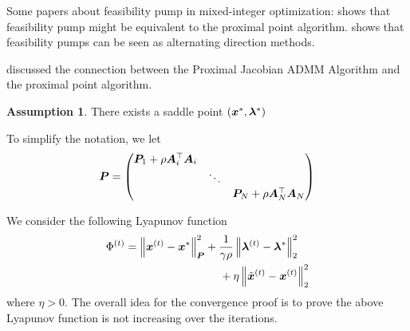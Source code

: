 \documentclass[twocolumn,amsthm]{autart}%
\theoremstyle{definition}
\newtheorem{assumption}{Assumption}
\theoremstyle{plain}
\begin{document}
Some papers about feasibility pump in mixed-integer optimization: \cite{boland2012new} shows that feasibility pump might be equivalent to the proximal point algorithm.
\cite{geissler2017penalty} shows that feasibility pumps can be seen as alternating direction methods.

\cite[Section V]{deng2017parallel} discussed the connection between the Proximal Jacobian ADMM Algorithm and the proximal point algorithm.


\begin{assumption}
There exists a saddle point $(\boldsymbol{x}^{*}, \boldsymbol{\lambda}^{*})$
\end{assumption}

To simplify the notation, we let
\begin{equation}
\boldsymbol{P} = 
\begin{pmatrix}
\boldsymbol{P}_{1} + \rho \boldsymbol{A}_i^\top \boldsymbol{A}_i \\
& \ddots \\
& & \boldsymbol{P}_N + \rho \boldsymbol{A}_N^\top \boldsymbol{A}_N
\end{pmatrix}
\end{equation}

We consider the following Lyapunov function
\begin{equation}
\begin{multlined}
\Phi^{(t)} = \norm{\bbsym{x}^{(t)}-\bbsym{x}^{*}}^2_{\bbsym{P}}
+ \frac{1}{\gamma \rho} \norm{\bbsym{\lambda}^{(t)}-\bbsym{\lambda}^{*}}_2^2 \\
+ \eta \norm{\xtil^{(t)} - \bbsym{x}^{(t)}}_2^2
\end{multlined}
\end{equation}
where $\eta > 0$.
The overall idea for the convergence proof is to prove the above Lyapunov function is not increasing over the iterations.
\end{document}
